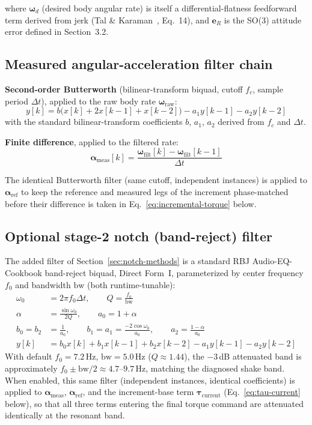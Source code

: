 \documentclass[11pt,a4paper]{article}
\begin{document}
where $\boldsymbol{\omega}_d$ (desired body angular rate) is itself a differential-flatness
feedforward term derived from jerk (Tal \& Karaman~\cite{tal2020}, Eq.~14), and $\mathbf{e}_R$ is the SO(3)
attitude error defined in Section~3.2.

\subsection{Measured angular-acceleration filter chain}

\textbf{Second-order Butterworth} (bilinear-transform biquad, cutoff $f_c$, sample period
$\Delta t$), applied to the raw body rate $\boldsymbol{\omega}_{\mathrm{raw}}$:
\[
  y[k] = b\big(x[k] + 2x[k-1] + x[k-2]\big) - a_1 y[k-1] - a_2 y[k-2]
\]
with the standard bilinear-transform coefficients $b$, $a_1$, $a_2$ derived from $f_c$ and
$\Delta t$.

\textbf{Finite difference}, applied to the filtered rate:
\[
  \boldsymbol{\alpha}_{\mathrm{meas}}[k] = \frac{\boldsymbol{\omega}_{\mathrm{filt}}[k]
    - \boldsymbol{\omega}_{\mathrm{filt}}[k-1]}{\Delta t}
\]

The identical Butterworth filter (same cutoff, independent instances) is applied to
$\boldsymbol{\alpha}_{\mathrm{ref}}$ to keep the reference and measured legs of the increment
phase-matched before their difference is taken in Eq.~\eqref{eq:incremental-torque} below.

\subsection{Optional stage-2 notch (band-reject) filter}

The added filter of Section~\ref{sec:notch-methods} is a standard RBJ Audio-EQ-Cookbook
band-reject biquad, Direct Form~I, parameterized by center frequency $f_0$ and bandwidth
$\mathrm{bw}$ (both runtime-tunable):
\begin{align}
  \omega_0 &= 2\pi f_0 \Delta t, \qquad Q = \frac{f_0}{\mathrm{bw}} \\
  \alpha &= \frac{\sin\omega_0}{2Q}, \qquad a_0 = 1+\alpha \\
  b_0 = b_2 &= \frac{1}{a_0}, \qquad
  b_1 = a_1 = \frac{-2\cos\omega_0}{a_0}, \qquad
  a_2 = \frac{1-\alpha}{a_0} \\
  y[k] &= b_0 x[k] + b_1 x[k-1] + b_2 x[k-2] - a_1 y[k-1] - a_2 y[k-2]
\end{align}
With default $f_0=7.2$\,Hz, $\mathrm{bw}=5.0$\,Hz ($Q\approx1.44$), the $-3$\,dB attenuated band is
approximately $f_0\pm\mathrm{bw}/2 \approx 4.7$--$9.7$\,Hz, matching the diagnosed shake band.
When enabled, this same filter (independent instances, identical coefficients) is applied to
$\boldsymbol{\alpha}_{\mathrm{meas}}$, $\boldsymbol{\alpha}_{\mathrm{ref}}$, and the
increment-base term $\boldsymbol{\tau}_{\mathrm{current}}$ (Eq.~\eqref{eq:tau-current} below), so that all three
terms entering the final torque command are attenuated identically at the resonant band.
\end{document}
